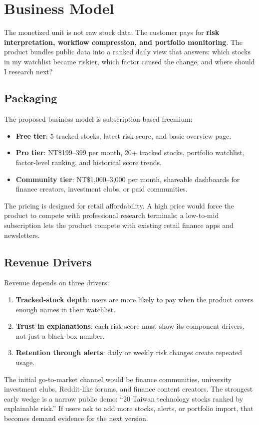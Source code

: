 \section{Business Model}
\label{sec:business-model}

The monetized unit is not raw stock data. The customer pays for \textbf{risk interpretation, workflow compression, and portfolio monitoring}. The product bundles public data into a ranked daily view that answers: which stocks in my watchlist became riskier, which factor caused the change, and where should I research next?

\subsection{Packaging}

The proposed business model is subscription-based freemium:

\begin{itemize}
    \item \textbf{Free tier}: 5 tracked stocks, latest risk score, and basic overview page.
    \item \textbf{Pro tier}: NT\$199--399 per month, 20+ tracked stocks, portfolio watchlist, factor-level ranking, and historical score trends.
    \item \textbf{Community tier}: NT\$1,000--3,000 per month, shareable dashboards for finance creators, investment clubs, or paid communities.
\end{itemize}

The pricing is designed for retail affordability. A high price would force the product to compete with professional research terminals; a low-to-mid subscription lets the product compete with existing retail finance apps and newsletters.

\subsection{Revenue Drivers}

Revenue depends on three drivers:

\begin{enumerate}
    \item \textbf{Tracked-stock depth}: users are more likely to pay when the product covers enough names in their watchlist.
    \item \textbf{Trust in explanations}: each risk score must show its component drivers, not just a black-box number.
    \item \textbf{Retention through alerts}: daily or weekly risk changes create repeated usage.
\end{enumerate}

The initial go-to-market channel would be finance communities, university investment clubs, Reddit-like forums, and finance content creators. The strongest early wedge is a narrow public demo: ``20 Taiwan technology stocks ranked by explainable risk.'' If users ask to add more stocks, alerts, or portfolio import, that becomes demand evidence for the next version.
